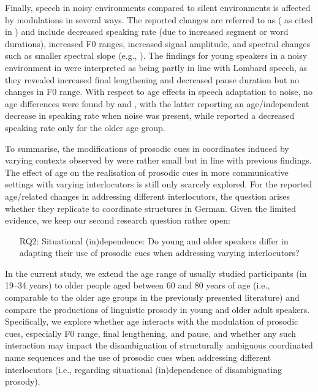 \documentclass[output=paper]{langscibook}
\begin{document}
Finally, speech in noisy environments compared to silent environments is affected by modulations in several ways. The reported changes  are referred to as  (\citealt{lombard_signe_1911} as cited in \citealt{zollinger_evolution_2011}) and include decreased speaking rate (due to increased segment or word durations), increased F0 ranges, increased signal amplitude, and spectral changes such as smaller spectral slope (e.g., \cite{junqua_influence_1996,summers_effects_1988,jessen_effect_2003, zollinger_evolution_2011, smiljanic2017, tuomainen2019, tuomainen2021age}). The findings for young speakers in a noisy environment in \citet{huttenlauchetal2021} were interpreted as being partly in line with Lombard speech, as they revealed increased final lengthening and decreased pause duration but no changes in F0 range.
With respect to age effects in speech adaptation to noise, no age differences were found by \citet{dromey_scott2016_noise_age} and \citet{smiljanic2017}, with the latter reporting an age\-/independent decrease in speaking rate when noise was present, while \citet{tuomainen2019} reported a decreased speaking rate only for the older age group. 

To summarise, the modifications of prosodic cues in coordinates induced by varying contexts observed by \citet{huttenlauchetal2021} were rather small but in line with previous findings. The effect of age on the realisation of prosodic cues in more communicative settings with varying interlocutors is still only scarcely explored. For the reported age\-/related changes in addressing different interlocutors, the question arises whether they replicate to coordinate structures in German. Given the limited evidence, we keep our second research question rather open:

\begin{enumerate}
    \item[RQ2:] Situational (in)dependence: Do young and older speakers differ in adapting their use of prosodic cues when addressing varying interlocutors?
\end{enumerate}

In the current study, we extend the age range of usually studied participants (in \citealt{huttenlauchetal2021} 19--34 years) to older people aged between 60 and 80 years of age (i.e., comparable to the older age groups in the previously presented literature) and compare the productions of linguistic prosody in young and older adult speakers. Specifically, we explore whether age interacts with the modulation of prosodic cues, especially F0 range, final lengthening, and pause, and whether any such interaction may impact the disambiguation of structurally ambiguous coordinated name sequences and the use of prosodic cues when addressing different interlocutors (i.e., regarding situational (in)de\-pen\-dence of disambiguating prosody).  
\end{document}
